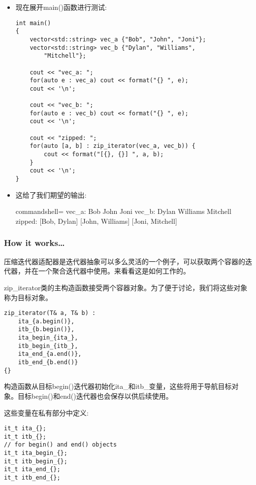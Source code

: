 \begin{itemize}
\item 
现在展开main()函数进行测试:

\begin{lstlisting}[style=styleCXX]
int main()
{
	vector<std::string> vec_a {"Bob", "John", "Joni"};
	vector<std::string> vec_b {"Dylan", "Williams",
		"Mitchell"};
	
	cout << "vec_a: ";
	for(auto e : vec_a) cout << format("{} ", e);
	cout << '\n';
	
	cout << "vec_b: ";
	for(auto e : vec_b) cout << format("{} ", e);
	cout << '\n';
	
	cout << "zipped: ";
	for(auto [a, b] : zip_iterator(vec_a, vec_b)) {
		cout << format("[{}, {}] ", a, b);
	}
	cout << '\n';
}
\end{lstlisting}


\item 
这给了我们期望的输出:

\begin{tcblisting}{commandshell={}}
vec_a: Bob John Joni
vec_b: Dylan Williams Mitchell
zipped: [Bob, Dylan] [John, Williams] [Joni, Mitchell]
\end{tcblisting}

\end{itemize}

\subsubsection{How it works…}

压缩迭代器适配器是迭代器抽象可以多么灵活的一个例子，可以获取两个容器的迭代器，并在一个聚合迭代器中使用。来看看这是如何工作的。

zip\_iterator类的主构造函数接受两个容器对象。为了便于讨论，我们将这些对象称为目标对象。

\begin{lstlisting}[style=styleCXX]
zip_iterator(T& a, T& b) :
	ita_{a.begin()},
	itb_{b.begin()},
	ita_begin_{ita_},
	itb_begin_{itb_},
	ita_end_{a.end()},
	itb_end_{b.end()}
{}
\end{lstlisting}

构造函数从目标begin()迭代器初始化ita\_和itb\_变量，这些将用于导航目标对象。目标begin()和end()迭代器也会保存以供后续使用。

这些变量在私有部分中定义:

\begin{lstlisting}[style=styleCXX]
it_t ita_{};
it_t itb_{};
// for begin() and end() objects
it_t ita_begin_{};
it_t itb_begin_{};
it_t ita_end_{};
it_t itb_end_{};
\end{lstlisting}

